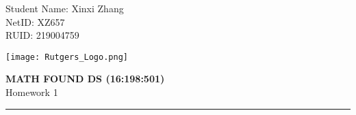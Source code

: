 \documentclass[11pt,letterpaper]{article}
\begin{document}
\pagestyle{plain}

\begin{flushleft}
Student Name: Xinxi Zhang\\
NetID: XZ657  \\
RUID: 219004759
\end{flushleft}

\begin{flushright}\vspace{-15mm}
\texttt{[image: Rutgers\_Logo.png]}
\end{flushright}
 
\begin{center}\vspace{-1cm}
\textbf{\large MATH FOUND DS (16:198:501)}\\
Homework 1
\end{center}

 
\rule{\linewidth}{0.1mm}

\bigskip
\bigskip
\end{document}
